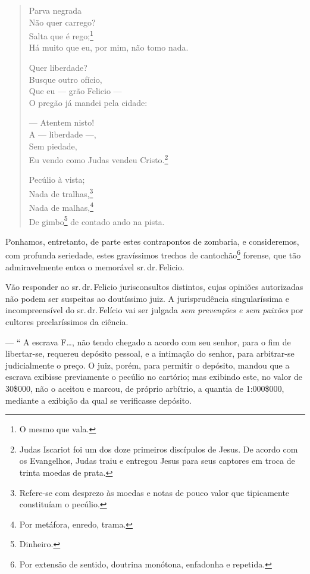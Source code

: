 \begin{verse}
Parva negrada\\
Não quer carrego?\\
Salta que é rego;\footnote{ O mesmo que vala.}\\
Há muito que eu, por mim, não tomo nada.

Quer liberdade?\\
Busque outro ofício,\\
Que eu --- grão Felicio ---\\
O pregão já mandei pela cidade:

--- Atentem nisto!\\
A --- liberdade ---,\\
Sem piedade,\\
Eu vendo como Judas vendeu Cristo.\footnote{ Judas Iscariot foi um dos
  doze primeiros discípulos de Jesus. De acordo com os Evangelhos, Judas
  traiu e entregou Jesus para seus captores em troca de trinta moedas de
  prata.}

Pecúlio à vista;\\
Nada de tralhas,\footnote{Refere-se com desprezo às moedas e notas de
  pouco valor que tipicamente constituíam o pecúlio.}\\
Nada de malhas,\footnote{ Por metáfora, enredo, trama.}\\
De gimbo\footnote{Dinheiro.} de contado ando na pista.
\end{verse}

Ponhamos, entretanto, de parte estes contrapontos de zombaria, e
consideremos, com profunda seriedade, estes gravíssimos trechos de
cantochão\footnote{ Por extensão de sentido, doutrina monótona,
  enfadonha e repetida.} forense, que tão admiravelmente entoa o
memorável sr.\,dr.\,Felicio.

\asterisc

Vão responder ao sr.\,dr.\,Felicio jurisconsultos distintos, cujas
opiniões autorizadas não podem ser suspeitas ao doutíssimo juiz. A
jurisprudência singularíssima e incompreensível do sr.\,dr.\,Felício vai
ser julgada \emph{sem prevenções e sem paixões} por cultores
preclaríssimos da ciência.

--- `` A escrava F\ldots{}, não tendo chegado a acordo com seu senhor, para o
fim de libertar-se, requereu depósito pessoal, e a intimação do senhor,
para arbitrar-se judicialmente o preço. O juiz, porém, para permitir o
depósito, mandou que a escrava exibisse previamente o pecúlio no
cartório; mas exibindo este, no valor de 30\$000, não o aceitou e
marcou, de próprio arbítrio, a quantia de 1:000\$000, mediante a
exibição da qual se verificasse depósito.

